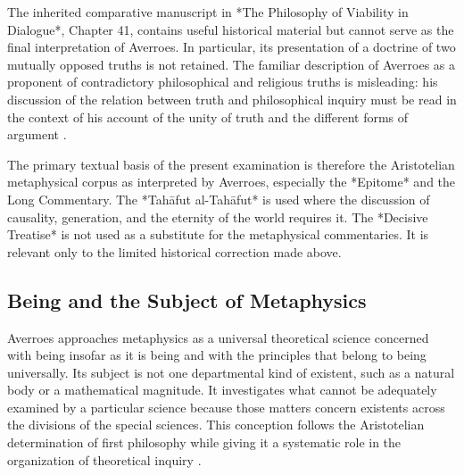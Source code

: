 \label{para:VS.B01.P01.C08.S15.SS02.P004}

The inherited comparative manuscript in
*The Philosophy of Viability in Dialogue*, Chapter 41, contains
useful historical material but cannot serve as the final
interpretation of Averroes. In particular, its presentation of
a doctrine of two mutually opposed truths is not retained.
The familiar description of Averroes as a proponent of
contradictory philosophical and religious truths is misleading:
his discussion of the relation between truth and philosophical
inquiry must be read in the context of his account of the unity
of truth and the different forms of argument
\citep{AverroesDecisiveTreatise,
TaylorAverroesUnityOfTruth2000}.

\label{para:VS.B01.P01.C08.S15.SS02.P005}

The primary textual basis of the present examination is therefore
the Aristotelian metaphysical corpus as interpreted by Averroes,
especially the *Epitome* and the Long Commentary. The
*Tahāfut al-Tahāfut* is used where the discussion of causality,
generation, and the eternity of the world requires it. The
*Decisive Treatise* is not used as a substitute for the
metaphysical commentaries. It is relevant only to the limited
historical correction made above.



\subsection{Being and the Subject of Metaphysics}
\label{subsec:ch08_s15_ss03}

\label{para:VS.B01.P01.C08.S15.SS03.P001}

Averroes approaches metaphysics as a universal theoretical science
concerned with being insofar as it is being and with the principles
that belong to being universally. Its subject is not one
departmental kind of existent, such as a natural body or a
mathematical magnitude. It investigates what cannot be adequately
examined by a particular science because those matters concern
existents across the divisions of the special sciences. This
conception follows the Aristotelian determination of first
philosophy while giving it a systematic role in the organization
of theoretical inquiry
\citep{AristotleMetaphysics,
AverroesEpitomeMetaphysicsArnzen2010}.

